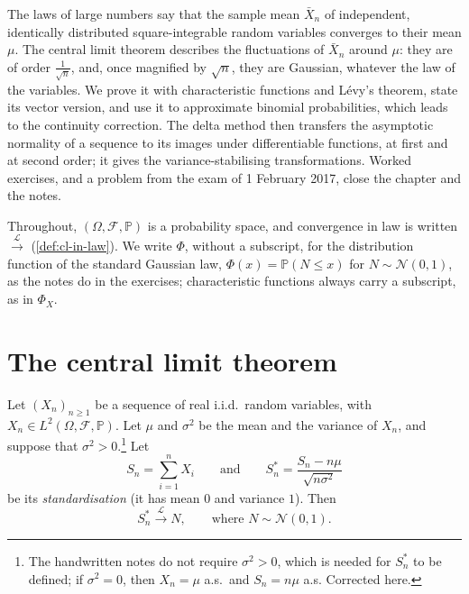 
The laws of large numbers say that the sample mean $\bar X_n$ of independent, identically
distributed square-integrable random variables converges to their mean $\mu$. The central limit
theorem describes the fluctuations of $\bar X_n$ around $\mu$: they are of order
$\frac1{\sqrt n}$, and, once magnified by $\sqrt n$, they are Gaussian, whatever the law of the
variables. We prove it with characteristic functions and Lévy's theorem, state its vector
version, and use it to approximate binomial probabilities, which leads to the continuity
correction. The delta method then transfers the asymptotic normality of a sequence to its images
under differentiable functions, at first and at second order; it gives the
variance-stabilising transformations. Worked exercises, and a problem from the exam of
1 February 2017, close the chapter and the notes.

Throughout, $(\Omega,\mathcal F,\mathbb P)$ is a probability space, and convergence in law is
written $\xrightarrow{\mathcal L}$ (\cref{def:cl-in-law}). We write $\Phi$, without a subscript,
for the distribution function of the standard Gaussian law, $\Phi(x)=\mathbb P(N\le x)$ for
$N\sim\mathcal N(0,1)$, as the notes do in the exercises; characteristic functions always carry a
subscript, as in $\Phi_X$.

\section{The central limit theorem}\label{sec:ct-clt}

\begin{theorem}\label{thm:ct-clt}
Let $(X_n)_{n\ge1}$ be a sequence of real i.i.d.\ random variables, with
$X_n\in L^2(\Omega,\mathcal F,\mathbb P)$. Let $\mu$ and $\sigma^2$ be the mean and the variance of
$X_n$, and suppose that $\sigma^2>0$.\footnote{The handwritten notes do not require $\sigma^2>0$,
which is needed for $S_n^*$ to be defined; if $\sigma^2=0$, then $X_n=\mu$ a.s.\ and
$S_n=n\mu$ a.s. Corrected here.} Let
\[
  S_n=\sum_{i=1}^nX_i\qquad\text{and}\qquad S_n^*=\frac{S_n-n\mu}{\sqrt{n\sigma^2}}
\]
be its \emph{standardisation} (it has mean $0$ and variance $1$). Then
\[
  S_n^*\xrightarrow{\mathcal L}N,\qquad\text{where }N\sim\mathcal N(0,1).
\]
\end{theorem}

